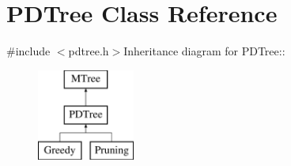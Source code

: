 \hypertarget{classPDTree}{
\section{PDTree Class Reference}
\label{classPDTree}
}


{\ttfamily \#include $<$pdtree.h$>$}Inheritance diagram for PDTree::\begin{figure}[H]
\begin{center}
\leavevmode
\includegraphics[height=3cm]{classPDTree}
\end{center}
\end{figure}
